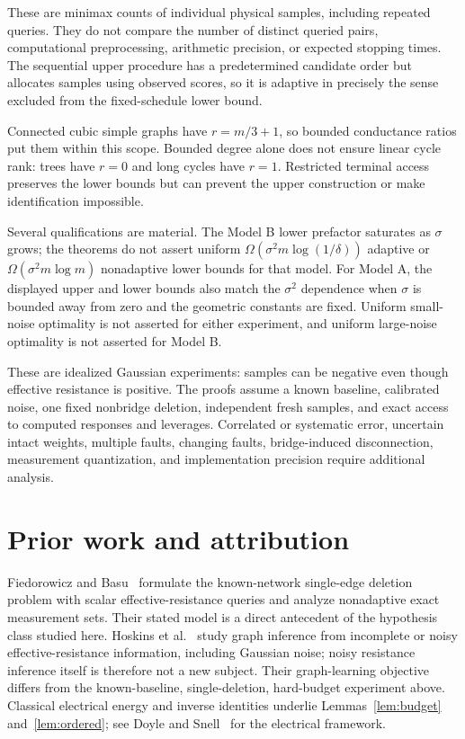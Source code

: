 \documentclass[11pt,letterpaper]{article}
\begin{document}
These are minimax counts of individual physical samples, including repeated queries. They do not compare the number of distinct queried pairs, computational preprocessing, arithmetic precision, or expected stopping times. The sequential upper procedure has a predetermined candidate order but allocates samples using observed scores, so it is adaptive in precisely the sense excluded from the fixed-schedule lower bound.

Connected cubic simple graphs have $r=m/3+1$, so bounded conductance ratios put them within this scope. Bounded degree alone does not ensure linear cycle rank: trees have $r=0$ and long cycles have $r=1$. Restricted terminal access preserves the lower bounds but can prevent the upper construction or make identification impossible.

Several qualifications are material. The Model B lower prefactor saturates as $\sigma$ grows; the theorems do not assert uniform $\Omega(\sigma^2m\log(1/\delta))$ adaptive or $\Omega(\sigma^2m\log m)$ nonadaptive lower bounds for that model. For Model A, the displayed upper and lower bounds also match the $\sigma^2$ dependence when $\sigma$ is bounded away from zero and the geometric constants are fixed. Uniform small-noise optimality is not asserted for either experiment, and uniform large-noise optimality is not asserted for Model B.

These are idealized Gaussian experiments: samples can be negative even though effective resistance is positive. The proofs assume a known baseline, calibrated noise, one fixed nonbridge deletion, independent fresh samples, and exact access to computed responses and leverages. Correlated or systematic error, uncertain intact weights, multiple faults, changing faults, bridge-induced disconnection, measurement quantization, and implementation precision require additional analysis.

\section{Prior work and attribution}
Fiedorowicz and Basu~\cite{FB} formulate the known-network single-edge deletion problem with scalar effective-resistance queries and analyze nonadaptive exact measurement sets. Their stated model is a direct antecedent of the hypothesis class studied here. Hoskins et al.~\cite{HMMT} study graph inference from incomplete or noisy effective-resistance information, including Gaussian noise; noisy resistance inference itself is therefore not a new subject. Their graph-learning objective differs from the known-baseline, single-deletion, hard-budget experiment above. Classical electrical energy and inverse identities underlie Lemmas~\ref{lem:budget} and~\ref{lem:ordered}; see Doyle and Snell~\cite{DS} for the electrical framework.
\end{document}
